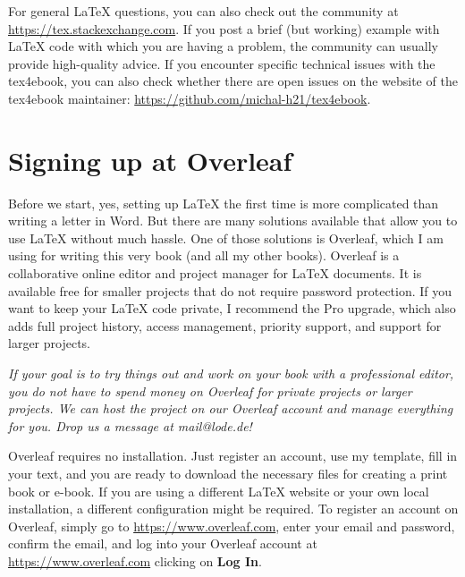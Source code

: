 For general LaTeX questions, you can also check out the community at \url{https://tex.stackexchange.com}. If you post a brief (but working) example with LaTeX code with which you are having a problem, the community can usually provide high-quality advice. If you encounter specific technical issues with the tex4ebook, you can also check whether there are open issues on the website of the tex4ebook maintainer: \url{https://github.com/michal-h21/tex4ebook}.


\section{Signing up at Overleaf}

Before we start, yes, setting up LaTeX the first time is more complicated than writing a letter in Word. But there are many solutions available that allow you to use LaTeX without much hassle. One of those solutions is Overleaf, which I am using for writing this very book (and all my other books). Overleaf is a collaborative online editor and project manager for LaTeX documents. It is available free for smaller projects that do not require password protection. If you want to keep your LaTeX code private, I recommend the Pro upgrade, which also adds full project history, access management, priority support, and support for larger projects.

\textit{If your goal is to try things out and work on your book with a professional editor, you do not have to spend money on Overleaf for private projects or larger projects. We can host the project on our Overleaf account and manage everything for you. Drop us a message at mail@lode.de!}



Overleaf requires no installation. Just register an account, use my template, fill in your text, and you are ready to download the necessary files for creating a print book or e-book. If you are using a different LaTeX website or your own local installation, a different configuration might be required. To register an account on Overleaf, simply go to \url{https://www.overleaf.com}, enter your email and password, confirm the email, and log into your Overleaf account at \url{https://www.overleaf.com} clicking on \textbf{Log In}.


